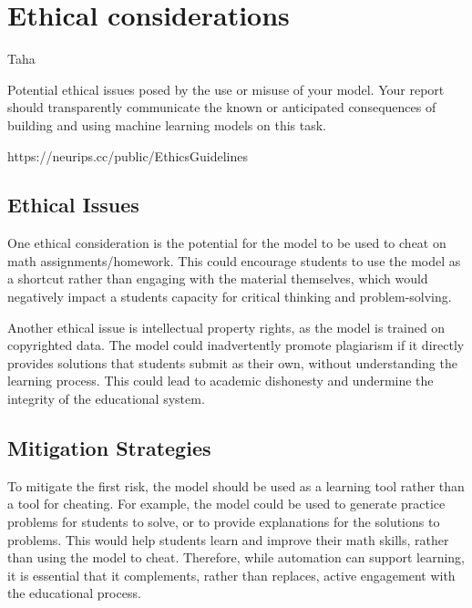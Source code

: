\documentclass{article}
\begin{document}

\section{Ethical considerations}
Taha

Potential ethical issues posed by the use or misuse of
your model. Your report should transparently
communicate the known or anticipated consequences
of building and using machine learning models on this
task.

https://neurips.cc/public/EthicsGuidelines

\subsection{Ethical Issues}
One ethical consideration is the potential for the model to be used to cheat on math assignments/homework. This could encourage students to use the model as a shortcut rather than engaging with the material themselves, which would negatively impact a students capacity for critical thinking and problem-solving. 

Another ethical issue is intellectual property rights, as the model is trained on copyrighted data. The model could inadvertently promote plagiarism if it directly provides solutions that students submit as their own, without understanding the learning process. This could lead to academic dishonesty and undermine the integrity of the educational system.

\subsection{Mitigation Strategies}
To mitigate the first risk, the model should be used as a learning tool rather than a tool for cheating. For example, the model could be used to generate practice problems for students to solve, or to provide explanations for the solutions to problems. This would help students learn and improve their math skills, rather than using the model to cheat. Therefore, while automation can support learning, it is essential that it complements, rather than replaces, active engagement with the educational process.
\end{document}
